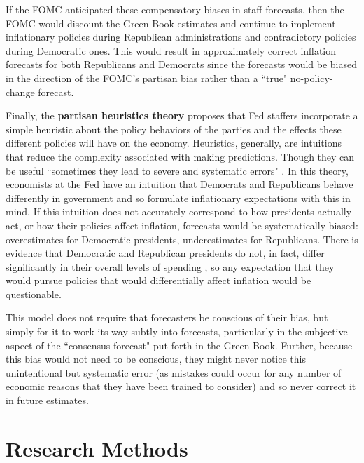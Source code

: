 \documentclass[a4paper]{article}\usepackage{graphicx, color}
\begin{document}
If the FOMC anticipated these compensatory biases in staff forecasts, then the FOMC would discount the Green Book estimates and continue to implement inflationary policies during Republican administrations and contradictory policies during Democratic ones. This would result in approximately correct inflation forecasts for both Republicans and Democrats since the forecasts would be biased in the direction of the FOMC's partisan bias rather than a ``true" no-policy-change forecast.
 
Finally, the {\bf{partisan heuristics theory}} proposes that Fed staffers incorporate a simple heuristic \citep[see][]{kahneman1973, tverskykahneman1974, kahneman2003} about the policy behaviors of the parties and the effects these different policies will have on the economy. Heuristics, generally, are intuitions that reduce the complexity associated with making predictions. Though they can be useful ``sometimes they lead to severe and systematic errors" \citep[][1124]{tverskykahneman1974}. In this theory, economists at the Fed have an intuition that Democrats and Republicans behave differently in government and so formulate inflationary expectations with this in mind. If this intuition does not accurately correspond to how presidents actually act, or how their policies affect inflation, forecasts would be systematically biased: overestimates for Democratic presidents, underestimates for Republicans. There is evidence that Democratic and Republican presidents do not, in fact, differ significantly in their overall levels of spending \citep{Bartels2008}, so any expectation that they would pursue policies that would differentially affect inflation would be questionable.

This model does not require that forecasters be conscious of their bias, but simply for it to work its way subtly into forecasts, particularly in the subjective aspect of the ``consensus forecast" put forth in the Green Book. Further, because this bias would not need to be conscious, they might never notice this unintentional but systematic error (as mistakes could occur for any number of economic reasons that they have been trained to consider) and so never correct it in future estimates.



\section{Research Methods}
\end{document}

